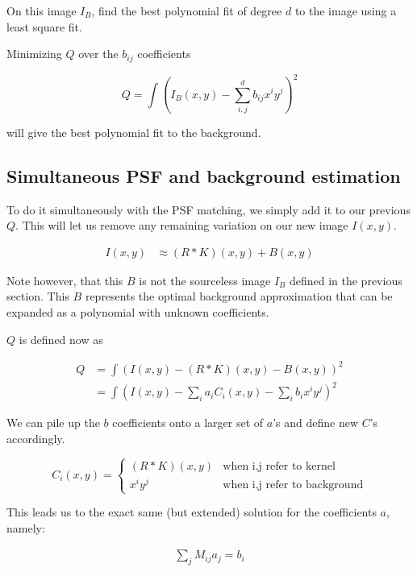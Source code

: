 On this image $I_{B}$, find the best polynomial fit of degree $d$ to the image using a least square fit.

Minimizing $Q$ over the $b_{ij}$ coefficients

\begin{equation}
Q = \int \left( I_{B}(x,y) - \sum_{i,j}^d b_{ij} x^i y^j \right) ^2
\end{equation}

will give the best polynomial fit to the background.

\subsection{Simultaneous PSF and background estimation}

To do it simultaneously with the PSF matching, we simply add it to our previous $Q$. This will let us remove any remaining variation on our new image $I(x,y)$.

\begin{align}
I(x,y) & \approx (R \mathbin{*} K)(x,y) + B(x,y) 
\end{align}

Note however, that this $B$ is not the sourceless image $I_{B}$ defined in the previous section. This $B$ represents the optimal background approximation that can be expanded as a polynomial with unknown coefficients.

$Q$ is defined now as

\begin{align}
Q &= \int \left( I(x,y) - (R \mathbin{*} K)(x,y) - B(x,y) \right)^2 \\
 & = \int \left( I(x,y) - \sum_{i} a_{i} C_{i}(x,y) - \sum_{i} b_{i} x^i y^j \right)^2
\end{align}

We can pile up the $b$ coefficients onto a larger set of $a$'s and define new $C$'s accordingly.

\begin{equation}
C_{i}(x,y)  = \begin{cases} 
(R \mathbin{*} K)(x,y)  &\mbox{when i,j refer to kernel}  \\ 
x^i y^j & \mbox{when i,j refer to background}  
\end{cases} 
\end{equation}

This leads us to the exact same (but extended) solution for the coefficients $a$, namely:

\begin{align}
\sum_{j} M_{ij} a_{j}  =  b_{i}
\end{align}

